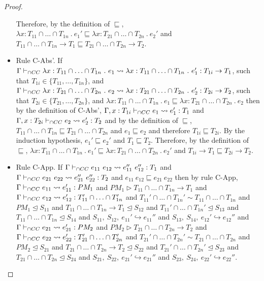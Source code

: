 \documentclass[a4paper]{article}
\begin{document}
\begin{proof}
\begin{itemize}
    Therefore, by the definition of $\sqsubseteq$, $\lambda x : T_{11} \cap \ldots \cap T_{1n}\ .\ e_1' \sqsubseteq \lambda x : T_{21} \cap \ldots \cap T_{2n}\ .\ e_2'$ and $T_{11} \cap \ldots \cap T_{1n} \rightarrow T_1 \sqsubseteq T_{21} \cap \ldots \cap T_{2n} \rightarrow T_2$.
    \item Rule C-Abs'.
    If $\Gamma \vdash_{\cap CC} \lambda x : T_{11} \cap \ldots \cap T_{1n}\ .\ e_1 \leadsto \lambda x : T_{11} \cap \ldots \cap T_{1n}\ .\ e_1': T_{1i} \rightarrow T_1$, such that $T_{1i} \in \{T_{11}, \ldots, T_{1n}\}$, and $\Gamma \vdash_{\cap CC} \lambda x : T_{21} \cap \ldots \cap T_{2n}\ .\ e_2 \leadsto \lambda x : T_{21} \cap \ldots \cap T_{2n}\ .\ e_2' : T_{2i} \rightarrow T_2$, such that $T_{2i} \in \{T_{21}, \ldots, T_{2n}\}$, and $\lambda x : T_{11} \cap \ldots \cap T_{1n}\ .\ e_1 \sqsubseteq \lambda x : T_{21} \cap \ldots \cap T_{2n}\ .\ e_2$ then by the definition of C-Abs', $\Gamma, x : T_{1i} \vdash_{\cap CC} e_1 \leadsto e_1': T_1$ and $\Gamma, x : T_{2i} \vdash_{\cap CC} e_2 \leadsto e_2': T_2$ and by the definition of $\sqsubseteq$, $T_{11} \cap \ldots \cap T_{1n} \sqsubseteq T_{21} \cap \ldots \cap T_{2n}$ and $e_1 \sqsubseteq e_2$ and therefore $T_{1i} \sqsubseteq T_{2i}$.
    By the induction hypothesis, $e_1' \sqsubseteq e_2'$ and $T_1 \sqsubseteq T_2$.
    Therefore, by the definition of $\sqsubseteq$, $\lambda x : T_{11} \cap \ldots \cap T_{1n}\ .\ e_1' \sqsubseteq \lambda x : T_{21} \cap \ldots \cap T_{2n}\ .\ e_2'$ and $T_{1i} \rightarrow T_1 \sqsubseteq T_{2i} \rightarrow T_2$.
    \item Rule C-App.
    If $\Gamma \iccts e_{11}\ e_{12} \leadsto e_{11}''\ e_{12}'' : T_1$ and $\Gamma \iccts e_{21}\ e_{22} \leadsto e_{21}''\ e_{22}'' : T_2$ and $e_{11}\ e_{12} \sqsubseteq e_{21}\ e_{22}$ then by rule C-App, $\Gamma \vdash_{\cap CC} e_{11} \leadsto e_{11}' : PM_1$ and $PM_1 \rhd T_{11} \cap \ldots \cap T_{1n} \rightarrow T_1$ and $\Gamma \vdash_{\cap CC} e_{12} \leadsto e_{12}' : T_{11}' \cap \ldots \cap T_{1n}'$ and $T_{11}' \cap \ldots \cap T_{1n}' \sim T_{11} \cap \ldots \cap T_{1n}$ and $PM_1 \trianglelefteq S_{11}$ and $T_{11} \cap \ldots \cap T_{1n} \rightarrow T_1 \trianglelefteq S_{12}$ and $T_{11}' \cap \ldots \cap T_{1n}' \trianglelefteq S_{13}$ and $T_{11} \cap \ldots \cap T_{1n} \trianglelefteq S_{14}$ and $S_{11},\ S_{12},\ e_{11}' \hookrightarrow e_{11}''$ and $S_{13},\ S_{14},\ e_{12}' \hookrightarrow e_{12}''$ and $\Gamma \vdash_{\cap CC} e_{21} \leadsto e_{21}' : PM_2$ and $PM_2 \rhd T_{21} \cap \ldots \cap T_{2n} \rightarrow T_2$ and $\Gamma \vdash_{\cap CC} e_{22} \leadsto e_{22}' : T_{21}' \cap \ldots \cap T_{2n}'$ and $T_{21}' \cap \ldots \cap T_{2n}' \sim T_{21} \cap \ldots \cap T_{2n}$ and $PM_2 \trianglelefteq S_{21}$ and $T_{21} \cap \ldots \cap T_{2n} \rightarrow T_2 \trianglelefteq S_{22}$ and $T_{21}' \cap \ldots \cap T_{2n}' \trianglelefteq S_{23}$ and $T_{21} \cap \ldots \cap T_{2n} \trianglelefteq S_{24}$ and $S_{21},\ S_{22},\ e_{21}' \hookrightarrow e_{21}''$ and $S_{23},\ S_{24},\ e_{22}' \hookrightarrow e_{22}''$.

\end{itemize}
\end{proof}
\end{document}
